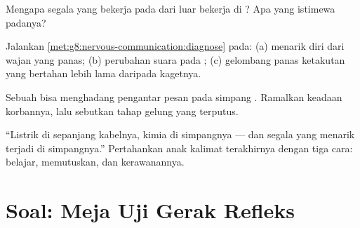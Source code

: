 \begin{exercise}[$\star\star$]\label{exo:g8:nervous-communication:9}
Mengapa segala yang bekerja pada  dari luar
bekerja di ? Apa yang istimewa padanya?
\end{exercise}

\begin{exercise}[$\star\star$]\label{exo:g8:nervous-communication:10}
Jalankan \cref{met:g8:nervous-communication:diagnose} pada:
(a) menarik diri dari wajan yang panas; (b) perubahan suara
pada ; (c) gelombang panas ketakutan yang
bertahan lebih lama daripada kagetnya.
\end{exercise}

\begin{exercise}[$\star\star$]\label{exo:g8:nervous-communication:11}
Sebuah bisa menghadang pengantar pesan pada simpang .
Ramalkan keadaan korbannya, lalu sebutkan tahap gelung yang
terputus.
\end{exercise}

\begin{exercise}[$\star\star\star$]\label{exo:g8:nervous-communication:12}
``Listrik di sepanjang kabelnya, kimia di simpangnya --- dan
segala yang menarik terjadi di simpangnya.'' Pertahankan
anak kalimat terakhirnya dengan tiga cara: belajar,
memutuskan, dan kerawanannya.
\end{exercise}

\section{Soal: Meja Uji Gerak Refleks}

